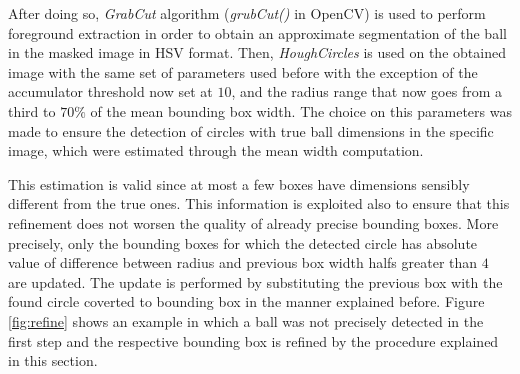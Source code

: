 After doing so, \textit{GrabCut} algorithm (\textit{grubCut()} in OpenCV) is used to perform foreground extraction in order to obtain an approximate segmentation of the ball in the masked image in HSV format. 
Then, \textit{HoughCircles} is used on the obtained image with the same set of parameters used before with the exception of the accumulator threshold now set at $10$, and
the radius range that now goes from a third to $70\%$ of the mean bounding box width. The choice on this parameters was made to ensure the detection of circles with true ball dimensions
in the specific image, which were estimated through the mean width computation.

This estimation is valid since at most a few boxes have dimensions sensibly different from the true ones. This information is exploited also to ensure that this refinement
does not worsen the quality of already precise bounding boxes. More precisely, only the bounding boxes for which the detected circle has absolute value of difference between radius and previous box
width halfs greater than $4$ are updated. The update is performed by substituting the previous box with the found circle coverted to bounding box in the manner explained before.
Figure \ref{fig:refine} shows an example in which a ball was not precisely detected in the first step and the respective bounding box is refined by the procedure explained in this section. \\
